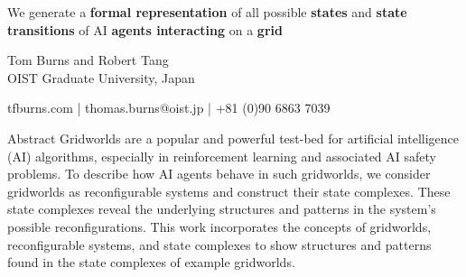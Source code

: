 \documentclass[
    a0paper, %
    portrait, %
    fontscale=0.4 %
    ]{baposter}
\begin{document}
\begin{poster}
\begin{posterbox}
\begin{minipage}[c][ 0.4 \textheight ]{0.6\textwidth}
        We generate a \textbf{formal representation} of all possible \textbf{states} and \textbf{state transitions} of AI \textbf{agents interacting} on a \textbf{grid}

        \vspace{2em}
        
        \LARGE 
        Tom Burns and Robert Tang\\ 
        OIST Graduate University, Japan
    \end{minipage}

    \vspace{-5em} \hfill 
    \colorbox{white}{ 
    } \hspace{0.3em}

    \vspace{0.3em}
    \hfill {\normalsize tfburns.com | thomas.burns@oist.jp | +81 (0)90 6863 7039 }
    \vspace{0.3em}

\end{posterbox}



\begin{posterbox}[
    name = abstract,  %
    column = 0, %
    below = message %
    ]{Abstract}
Gridworlds are a popular and powerful test-bed for artificial intelligence (AI) algorithms, especially in reinforcement learning and associated AI safety problems. To describe how AI agents behave in such gridworlds, we consider gridworlds as reconfigurable systems and construct their state complexes. These state complexes reveal the underlying structures and patterns in the system's possible reconfigurations. This work incorporates the concepts of gridworlds, reconfigurable systems, and state complexes to show structures and patterns found in the state complexes of example gridworlds.
\end{posterbox}



\end{poster}
\end{document}
